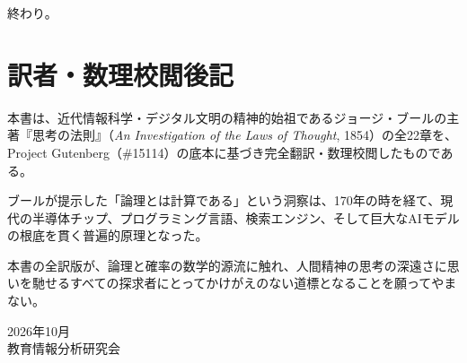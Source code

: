 \documentclass[a4paper,11pt,openany]{ltjsbook}
\begin{document}
\centerline{\textsc{終わり。}}


\backmatter

\chapter{訳者・数理校閲後記}

本書は、近代情報科学・デジタル文明の精神的始祖であるジョージ・ブールの主著『思考の法則』（\textit{An Investigation of the Laws of Thought}, 1854）の全22章を、Project Gutenberg（\#15114）の底本に基づき完全翻訳・数理校閲したものである。

ブールが提示した「論理とは計算である」という洞察は、170年の時を経て、現代の半導体チップ、プログラミング言語、検索エンジン、そして巨大なAIモデルの根底を貫く普遍的原理となった。

本書の全訳版が、論理と確率の数学的源流に触れ、人間精神の思考の深遠さに思いを馳せるすべての探求者にとってかけがえのない道標となることを願ってやまない。

\begin{flushright}
2026年10月\\
教育情報分析研究会
\end{flushright}
\end{document}

